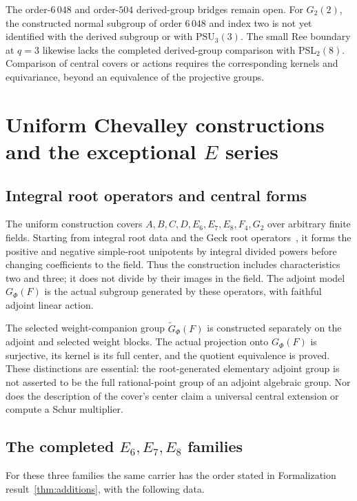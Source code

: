 \documentclass[11pt]{article}
\numberwithin{equation}{section}
\theoremstyle{definition}
\newcommand{\PSL}{\mathrm{PSL}}
\newcommand{\PSU}{\mathrm{PSU}}
\begin{document}
The order-$6\,048$ and order-$504$ derived-group bridges remain open.
For $G_2(2)$, the constructed normal subgroup of order $6\,048$ and
index two is not yet identified with the derived subgroup or with
$\PSU_3(3)$. The small Ree boundary at $q=3$ likewise lacks the completed
derived-group comparison with $\PSL_2(8)$. Comparison of central covers
or actions requires the corresponding kernels and equivariance, beyond
an equivalence of the projective groups.

\section{Uniform Chevalley constructions and the exceptional
\texorpdfstring{$E$}{E} series}\label{sec:chevalley}

\subsection{Integral root operators and central forms}

The uniform construction covers $A,B,C,D,E_6,E_7,E_8,F_4,G_2$ over
arbitrary finite fields. Starting from integral root data and the Geck
root operators~\cite{Geck}, it forms the positive and negative
simple-root unipotents by integral divided powers before changing
coefficients to the field. Thus the construction includes characteristics
two and three; it does not divide by their images in the field.
The adjoint model $G_\Phi(F)$ is the actual subgroup generated by these
operators, with faithful adjoint linear action.

The selected weight-companion group $\widetilde G_\Phi(F)$ is constructed
separately on the adjoint and selected weight blocks. The actual
projection onto $G_\Phi(F)$ is surjective, its kernel is its full center,
and the quotient equivalence is proved. These distinctions are essential:
the root-generated elementary adjoint group is not asserted to be the
full rational-point group of an adjoint algebraic group. Nor does the
description of the cover's center claim a universal central extension
or compute a Schur multiplier.

\subsection{The completed \texorpdfstring{$E_6,E_7,E_8$}{E6, E7, E8} families}

For these three families the same carrier has the order stated in
Formalization result~\ref{thm:additions}, with the following data.
\end{document}
